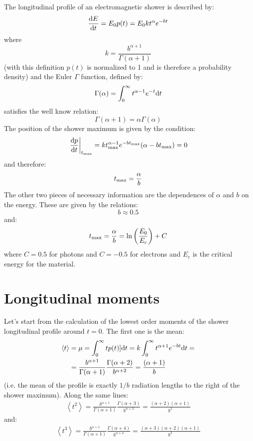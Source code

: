 \documentclass[a4paper,11pt]{article}
\newcommand{\firstder}[2]{\frac{{\rm d}#1}{{\rm d}#2}}
\newcommand{\tmax}{t_{\rm max}}
\newcommand{\diff}{{\rm d}}
\begin{document}
The longitudinal profile of an electromagnetic shower is described by:
\begin{equation}
\firstder{E}{t} = E_0 p(t) = E_0 k t^\alpha e^{-bt}
\end{equation}
where
$$
k = \frac{b^{\alpha + 1}}{\Gamma(\alpha + 1)}
$$
(with this definition $p(t)$ is normalized to 1 and is therefore a probability
density) and the Euler $\Gamma$ function, defined by:
$$
\Gamma(\alpha) = \int_{0}^\infty t^{\alpha - 1} e^{-t} \diff t
$$
satisfies the well know relation:
$$
\Gamma(\alpha + 1) = \alpha \Gamma(\alpha)
$$
The position of the shower maximum is given by the condition:
$$
\left.\firstder{p}{t}\right|_{\tmax} =
k \tmax^{\alpha - 1} e^{-b\tmax} (\alpha  - b\tmax) = 0
$$
and therefore:
\begin{equation}
\tmax = \frac{\alpha}{b}
\end{equation}
The other two pieces of necessary information are the dependences of $\alpha$
and $b$ on the energy. These are given by the relations:
\begin{equation}
b \approx 0.5
\end{equation}
and:
\begin{equation}
\tmax = \frac{\alpha}{b} = \ln\left(\frac{E_0}{E_c}\right) + C
\end{equation}
where $C=0.5$ for photons and $C=-0.5$ for electrons and $E_c$ is the critical
energy for the material.


\section{Longitudinal moments}

Let's start from the calculation of the lowest order moments of the shower
longitudinal profile around $t=0$. The first one is the mean:
\begin{align}
\left< t \right> &= \mu = \int_{0}^\infty t p(t) ] \diff t =
k \int_{0}^\infty t^{\alpha + 1} e^{-bt} \diff t =\nonumber\\
&= \frac{b^{\alpha + 1}}{\Gamma(\alpha + 1)}
\frac{\Gamma(\alpha + 2)}{b^{\alpha + 2}} = \frac{(\alpha + 1)}{b}
\end{align}
(i.e. the mean of the profile is exactly $1/b$ radiation lengths to the
right of the shower maximum). Along the same lines:
\begin{align}
\left< t^2 \right> = \frac{b^{\alpha + 1}}{\Gamma(\alpha + 1)}
\frac{\Gamma(\alpha + 3)}{b^{\alpha + 3}} =
\frac{(\alpha + 2)(\alpha + 1)}{b^2}
\end{align}
and:
\begin{align}
\left< t^3 \right> = \frac{b^{\alpha + 1}}{\Gamma(\alpha + 1)}
\frac{\Gamma(\alpha + 4)}{b^{\alpha + 4}} =
\frac{(\alpha + 3)(\alpha + 2)(\alpha + 1)}{b^3}
\end{align}
\end{document}
